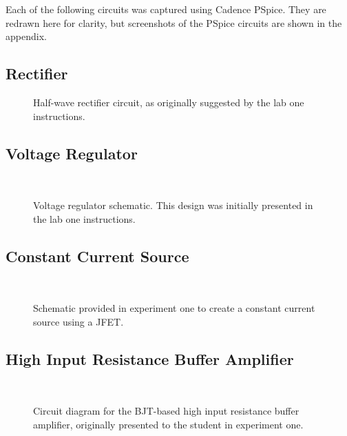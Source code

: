 Each of the following circuits was captured using Cadence PSpice.  They are
redrawn here for clarity, but screenshots of the PSpice circuits are shown in
the appendix.

\subsection{Rectifier}
\begin{figure}[H]
	\centering
	
	\parbox{3.5in}{
	\caption[Schematic --- Half-wave Rectifier]{Half-wave rectifier circuit, as
		originally suggested by the lab one instructions.}
	\label{fig:schem1}}
\end{figure}

\subsection{Voltage Regulator}
\begin{figure}[H]
	\centering
	\\
	\parbox{3.5in}{
	\caption[Schematic --- Voltage Regulator]{Voltage regulator schematic.
		This design was initially presented in the lab one instructions.}
	\label{fig:schem3}}
\end{figure}

\subsection{Constant Current Source}
\begin{figure}[H]
	\centering
	\\
	\parbox{3.5in}{
	\caption[Schematic --- Constant Current Source]{Schematic provided in
		experiment one to create a constant current source using a JFET.}
	\label{fig:schem4}}
\end{figure}

\subsection{High Input Resistance Buffer Amplifier}
\begin{figure}[H]
	\centering
	\\
	\parbox{3.5in}{
	\caption[Schematic --- Buffer Amplifier]{Circuit diagram for the BJT-based high input
		resistance buffer amplifier, originally presented to the student in
		experiment one.}
	\label{fig:schem5}}
\end{figure}

